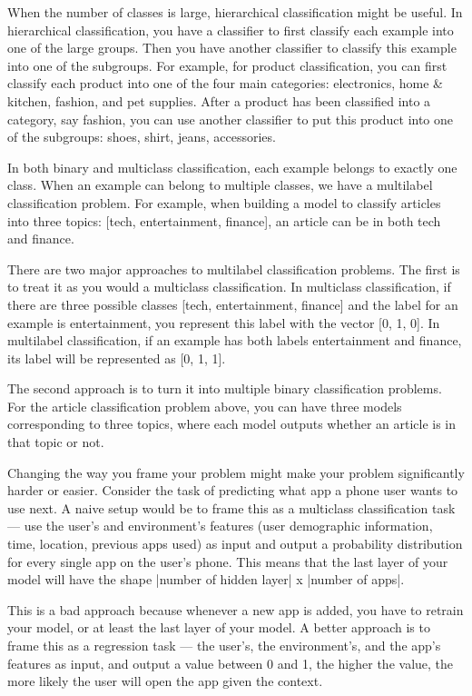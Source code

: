\documentclass[openany]{book}
\begin{document}
When the number of classes is large, hierarchical classification might be useful. In hierarchical classification, you have a classifier to first classify each example into one of the large groups. Then you have another classifier to classify this example into one of the subgroups. For example, for product classification, you can first classify each product into one of the four main categories: electronics, home & kitchen, fashion, and pet supplies. After a product has been classified into a category, say fashion, you can use another classifier to put this product into one of the subgroups: shoes, shirt, jeans, accessories.

In both binary and multiclass classification, each example belongs to exactly one class. When an example can belong to multiple classes, we have a multilabel classification problem. For example, when building a model to classify articles into three topics: [tech, entertainment, finance], an article can be in both tech and finance.

There are two major approaches to multilabel classification problems. The first is to treat it as you would a multiclass classification. In multiclass classification, if there are three possible classes [tech, entertainment, finance] and the label for an example is entertainment, you represent this label with the vector [0, 1, 0]. In multilabel classification, if an example has both labels entertainment and finance, its label will be represented as [0, 1, 1].

The second approach is to turn it into multiple binary classification problems. For the article classification problem above, you can have three models corresponding to three topics, where each model outputs whether an article is in that topic or not.

Changing the way you frame your problem might make your problem significantly harder or easier. Consider the task of predicting what app a phone user wants to use next. A naive setup would be to frame this as a multiclass classification task — use the user’s and environment’s features (user demographic information, time, location, previous apps used) as input and output a probability distribution for every single app on the user’s phone. This means that the last layer of your model will have the shape |number of hidden layer| x |number of apps|.

This is a bad approach because whenever a new app is added, you have to retrain your model, or at least the last layer of your model. A better approach is to frame this as a regression task — the user’s, the environment’s, and the app’s features as input, and output a value between 0 and 1, the higher the value, the more likely the user will open the app given the context.
\end{document}
